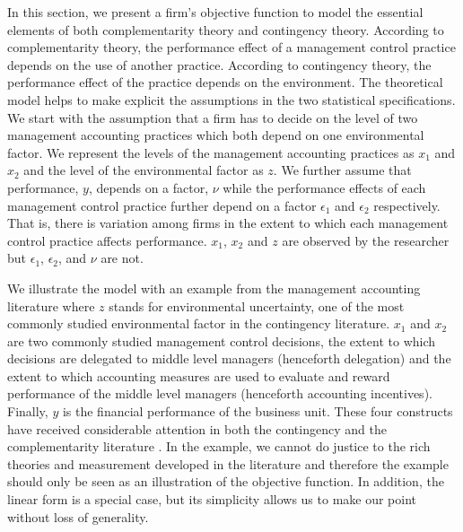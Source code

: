\documentclass[12pt]{article}
\begin{document}
In this section, we present a firm's objective function to model the essential elements of both complementarity theory and contingency theory. According to complementarity theory, the performance effect of a management control practice depends on the use of another practice. According to contingency theory, the performance effect of the practice depends on the environment. The theoretical model helps to make explicit the assumptions in the two statistical specifications. We start with the assumption that a firm has to decide on the level of two management accounting practices which both depend on one environmental factor. We represent the levels of the management accounting practices as  $x_1$ and $x_2$ and the level of the environmental factor as $z$. We further assume that performance, $y$, depends on a factor, $\nu$ while the performance effects of each management control practice further depend on a factor $\epsilon_1$ and $\epsilon_2$ respectively. That is, there is variation among firms in the extent to which each management control practice affects performance. $x_1$, $x_2$ and $z$ are observed by the researcher but $\epsilon_1$, $\epsilon_2$, and $\nu$ are not. 

We illustrate the model with an example from the management accounting literature where $z$ stands for environmental uncertainty, one of the most commonly studied environmental factor in the contingency literature. $x_1$ and $x_2$ are two commonly studied management control decisions, the extent to which decisions are delegated to middle level managers (henceforth delegation) and the extent to which accounting measures are used to evaluate and reward performance of the middle level managers (henceforth accounting incentives). Finally, $y$ is the financial performance of the business unit. These four constructs have received considerable attention in both the contingency and the complementarity literature \citep{grabner_management_2013,chenhall_management_2003, otley_contingency_2016}. In the example, we cannot do justice to the rich theories and measurement developed in the literature and therefore the example should only be seen as an illustration of the objective function. In addition, the linear form is a special case, but its simplicity allows us to make our point without loss of generality.
\end{document}
